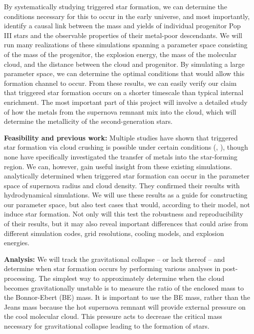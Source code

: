 \documentclass[a4paper, 12pt]{article}
\begin{document}
By systematically studying triggered star formation, we can determine the conditions necessary for this to occur in the early universe, and most importantly, identify a causal link between the mass and yields of individual progenitor Pop III stars and the observable properties of their metal-poor descendants. We will run many realizations of these simulations spanning a parameter space consisting of the mass of the progenitor, the explosion energy, the mass of the molecular cloud, and the distance between the cloud and progenitor. By simulating a large parameter space, we can determine the optimal conditions that would allow this formation channel to occur. From these results, we can easily verify our claim that triggered star formation occurs on a shorter timescale than typical internal enrichment. The most important part of this project will involve a detailed study of how the metals from the supernova remnant mix into the cloud, which will determine the metallicity of the second-generation stars.

\textbf{Feasibility and previous work:} Multiple studies have shown that triggered star formation via cloud crushing is possible under certain conditions (\cite{Melioli2006}, \cite{Leao2009}), though none have specifically investigated the transfer of metals into the star-forming region. We can, however, gain useful insight from these existing simulations. \cite{Melioli2006} analytically determined when triggered star formation can occur in the parameter space of supernova radius and cloud density. They confirmed their results with hydrodynamical simulations. We will use these results as a guide for constructing our parameter space, but also test cases that would, according to their model, not induce star formation. Not only will this test the robustness and reproducibility of their results, but it may also reveal important differences that could arise from different simulation codes, grid resolutions, cooling models, and explosion energies.

\textbf{Analysis:} We will track the gravitational collapse -- or lack thereof -- and determine when star formation occurs by performing various analyses in post-processing. The simplest way to approximately determine when the cloud becomes gravitationally unstable is to measure the ratio of the enclosed mass to the Bonnor-Ebert (BE) mass. It is important to use the BE mass, rather than the Jeans mass because the hot supernova remnant will provide external pressure on the cool molecular cloud. This pressure acts to decrease the critical mass necessary for gravitational collapse leading to the formation of stars.
\end{document}
